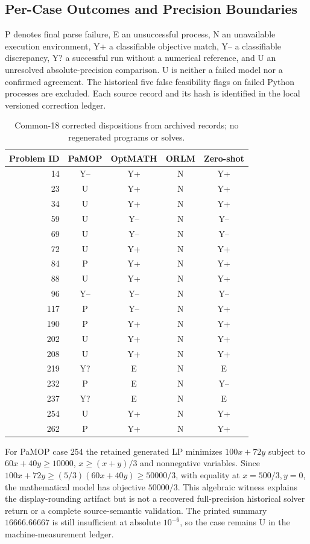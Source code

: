 \subsection{Per-Case Outcomes and Precision Boundaries}
P denotes final parse failure, E an unsuccessful process, N an unavailable execution environment, Y+ a classifiable objective match, Y-- a classifiable discrepancy, Y? a successful run without a numerical reference, and U an unresolved absolute-precision comparison. U is neither a failed model nor a confirmed agreement. The historical five false feasibility flags on failed Python processes are excluded. Each source record and its hash is identified in the local versioned correction ledger.
\begin{table}[htbp]\centering\small
\caption{Common-18 corrected dispositions from archived records; no regenerated programs or solves.}\label{tab:llm-cases}
\begin{tabular}{rcccc}\toprule
Problem ID & PaMOP & OptMATH & ORLM & Zero-shot\\\midrule
14 & Y-- & Y+ & N & Y+\\
23 & U & Y+ & N & Y+\\
34 & U & Y+ & N & Y+\\
59 & U & Y-- & N & Y--\\
69 & U & Y-- & N & Y--\\
72 & U & Y+ & N & Y+\\
84 & P & Y+ & N & Y+\\
88 & U & Y+ & N & Y+\\
96 & Y-- & Y-- & N & Y--\\
117 & P & Y-- & N & Y+\\
190 & P & Y+ & N & Y+\\
202 & U & Y+ & N & Y+\\
208 & U & Y+ & N & Y+\\
219 & Y? & E & N & E\\
232 & P & E & N & Y--\\
237 & Y? & E & N & E\\
254 & U & Y+ & N & Y+\\
262 & P & Y+ & N & Y+\\
\bottomrule\end{tabular}\end{table}

For PaMOP case 254 the retained generated LP minimizes $100x+72y$ subject to $60x+40y\geq10000$, $x\geq(x+y)/3$ and nonnegative variables. Since $100x+72y\geq(5/3)(60x+40y)\geq50000/3$, with equality at $x=500/3,y=0$, the mathematical model has objective $50000/3$. This algebraic witness explains the display-rounding artifact but is not a recovered full-precision historical solver return or a complete source-semantic validation. The printed summary $16666.66667$ is still insufficient at absolute $10^{-6}$, so the case remains U in the machine-measurement ledger.


